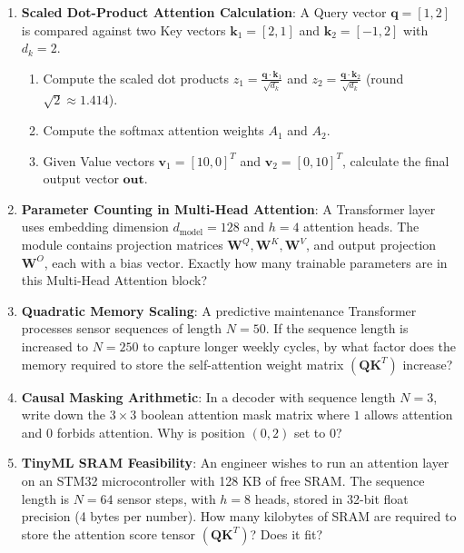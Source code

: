 \begin{checkyourself}
\begin{enumerate}
    \item \textbf{Scaled Dot-Product Attention Calculation}: A Query vector $\mathbf{q} = [1, 2]$ is compared against two Key vectors $\mathbf{k}_1 = [2, 1]$ and $\mathbf{k}_2 = [-1, 2]$ with $d_k = 2$.
    \begin{enumerate}[label=(\alph*)]
        \item Compute the scaled dot products $z_1 = \frac{\mathbf{q} \cdot \mathbf{k}_1}{\sqrt{d_k}}$ and $z_2 = \frac{\mathbf{q} \cdot \mathbf{k}_2}{\sqrt{d_k}}$ (round $\sqrt{2} \approx 1.414$).
        \item Compute the softmax attention weights $A_1$ and $A_2$.
        \item Given Value vectors $\mathbf{v}_1 = [10, 0]^T$ and $\mathbf{v}_2 = [0, 10]^T$, calculate the final output vector $\mathbf{out}$.
    \end{enumerate}
    \item \textbf{Parameter Counting in Multi-Head Attention}: A Transformer layer uses embedding dimension $d_{\text{model}} = 128$ and $h = 4$ attention heads. The module contains projection matrices $\mathbf{W}^Q, \mathbf{W}^K, \mathbf{W}^V$, and output projection $\mathbf{W}^O$, each with a bias vector. Exactly how many trainable parameters are in this Multi-Head Attention block?
    \item \textbf{Quadratic Memory Scaling}: A predictive maintenance Transformer processes sensor sequences of length $N = 50$. If the sequence length is increased to $N = 250$ to capture longer weekly cycles, by what factor does the memory required to store the self-attention weight matrix $(\mathbf{Q}\mathbf{K}^T)$ increase?
    \item \textbf{Causal Masking Arithmetic}: In a decoder with sequence length $N = 3$, write down the $3 \times 3$ boolean attention mask matrix where $1$ allows attention and $0$ forbids attention. Why is position $(0, 2)$ set to $0$?
    \item \textbf{TinyML SRAM Feasibility}: An engineer wishes to run an attention layer on an STM32 microcontroller with 128 KB of free SRAM. The sequence length is $N = 64$ sensor steps, with $h = 8$ heads, stored in 32-bit float precision (4 bytes per number). How many kilobytes of SRAM are required to store the attention score tensor $(\mathbf{Q}\mathbf{K}^T)$? Does it fit?
\end{enumerate}
\end{checkyourself}

